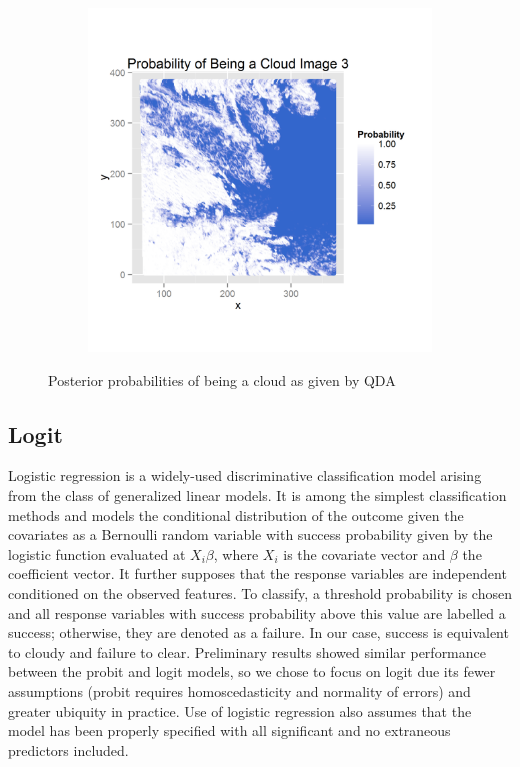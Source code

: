 \documentclass{article}\usepackage[]{graphicx}\usepackage[]{color}
\begin{document}
\begin{figure}[h]
\begin{subfigure}[b]{0.3\textwidth}
    \label{qda2}
  \end{subfigure}  
  \begin{subfigure}[b]{0.3\textwidth}
    \includegraphics[width=\linewidth]{qda3_prob.png}
    \label{qda3}
  \end{subfigure}  
  \caption{Posterior probabilities of being a cloud as given by QDA}
  \label{fig:QDA}
\end{figure}

\subsection{Logit}
Logistic regression is a widely-used discriminative classification model arising from the class of generalized linear models. It is among the simplest classification methods and models the conditional distribution of the outcome given the covariates as a Bernoulli random variable with success probability given by the logistic function evaluated at $X_i \beta$, where $X_i$ is the covariate vector and $\beta$ the coefficient vector. It further supposes that the response variables are independent conditioned on the observed features. To classify, a threshold probability is chosen and all response variables with success probability above this value are labelled a success; otherwise, they are denoted as a failure. In our case, success is equivalent to cloudy and failure to clear. Preliminary results showed similar performance between the probit and logit models,  so we chose to focus on logit due its fewer assumptions (probit requires homoscedasticity and normality of errors) and greater ubiquity in practice. Use of logistic regression also assumes that the model has been properly specified with all significant and no extraneous predictors included. 
\end{document}
